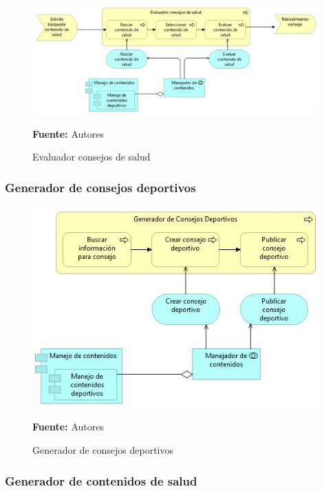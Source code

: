 \begin{figure}[!htb]
  \begin{center}
    \includegraphics[width=11cm]{./imagenes/Archimate/vistas/application_usage/evaluadorconsejossalud.png}
    \caption{Evaluador consejos de salud}
    \label{fig:BP_EvaluadorConsejosSalud}
    \textbf{Fuente:}  Autores
  \end{center}
\end{figure}

\subsubsection{Generador de consejos deportivos}

\begin{figure}[!htb]
  \begin{center}
    \includegraphics[width=11cm]{./imagenes/Archimate/vistas/application_usage/generadorconsejosdeportivos.png}
    \caption{Generador de consejos deportivos}
    \label{fig:BP_GeneradorConsejosDeportivos}
    \textbf{Fuente:}  Autores
  \end{center}
\end{figure}

\subsubsection{Generador de contenidos de salud}

